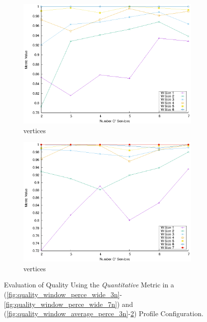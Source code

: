 \begin{figure}[!htb]
\begin{subfigure}{0.48\textwidth}
    \includegraphics[width=\textwidth]{Images/graphs/window_quality_performance_diff_perce_n7_s7_50_89_n6}
    \caption{ vertices}
    \label{fig:quality_window_average_perce_6n}
  \end{subfigure}
  \begin{subfigure}{0.48\textwidth}
    \includegraphics[width=\textwidth]{Images/graphs/window_quality_performance_diff_perce_n7_s7_50_89_n7}
    \caption{ vertices}
    \label{fig:quality_window_average_perce_7n}
  \end{subfigure}
  \caption{Evaluation of Quality Using the \emph{Quantitative} Metric in a \wide (\cref{fig:quality_window_perce_wide_3n}-\cref{fig:quality_window_perce_wide_7n}) and \average (\cref{fig:quality_window_average_perce_3n}-\cref{fig:quality_window_average_perce_7n}) Profile Configuration.}  \label{fig:quality_window_perce}
\end{figure}


